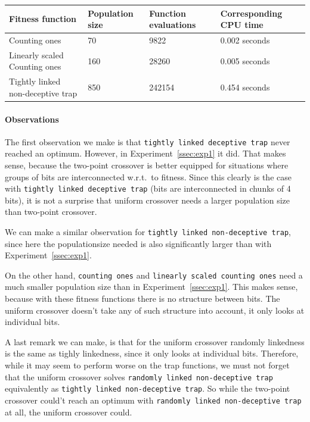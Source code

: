 \documentclass[12pt]{article}
\theoremstyle{definition}
\newcommand{\co}{\texttt{counting ones}}
\newcommand{\lsco}{\texttt{linearly scaled counting ones}}
\newcommand{\tdt}{\texttt{tightly linked deceptive trap}}
\newcommand{\tnt}{\texttt{tightly linked non-deceptive trap}}
\newcommand{\rnt}{\texttt{randomly linked non-deceptive trap}}
\begin{document}
\begin{table}[!htb]
\begin{adjustwidth}{0cm}{}
\centering
\begin{tabular}{lp{2.5cm}p{2.5cm}p{2.8cm}}
\toprule[1.5pt]
\bf Fitness function & \bf Population size & \bf Function evaluations & \bf Corresponding CPU time\\\midrule
Counting ones & 70 & 9822 & 0.002 seconds \\
Linearly scaled Counting ones & 160 & 28260 & 0.005 seconds \\
Tightly linked non-deceptive trap & 850 & 242154 & 0.454 seconds \\
\bottomrule[1.25pt]
\end{tabular}\par
\bigskip
{}
\label{tab:exp2}
\end{adjustwidth}
\end{table}

\paragraph{Observations}
The first observation we make is that \tdt{} never reached an optimum.
However, in Experiment~\ref{ssec:exp1} it did.
That makes sense, because the two-point crossover is better equipped for situations where
groups of bits are interconnected w.r.t.\ to fitness.
Since this clearly is the case with \tdt{} (bits are interconnected in chunks of 4 bits),
it is not a surprise that uniform crossover needs a larger population size than
two-point crossover.

We can make a similar observation for \tnt{}, since here the populationsize needed is also
significantly larger than with Experiment~\ref{ssec:exp1}.

On the other hand, \co{} and \lsco{} need a much smaller population size than in
Experiment~\ref{ssec:exp1}.
This makes sense, because with these fitness functions there is no structure between bits.
The uniform crossover doesn't take any of such structure into account, it only looks at
individual bits.

A last remark we can make, is that for the uniform crossover randomly linkedness is the same
as tighly linkedness, since it only looks at individual bits.
Therefore, while it may seem to perform worse on the trap functions, we must not forget
that the uniform crossover solves \rnt{} equivalently as \tnt{}.
So while the two-point crossover could't reach an optimum with \rnt{} at all,
the uniform crossover could.
\end{document}

